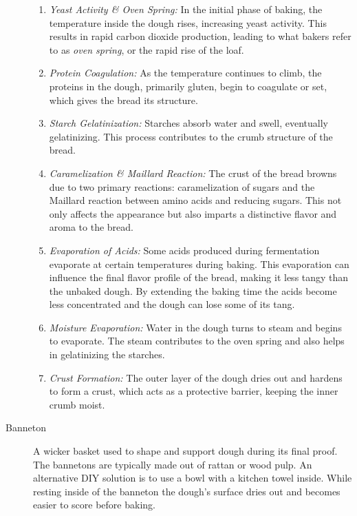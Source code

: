 \begin{description}
\begin{enumerate}
\item \emph{Yeast Activity \& Oven Spring:} In the initial phase of baking, the
temperature inside the dough rises, increasing yeast activity. This results in rapid
carbon dioxide production, leading to what bakers refer to as \emph{oven spring}, or the
rapid rise of the loaf.

\item \emph{Protein Coagulation:}  As the temperature continues to climb, the proteins
in the dough, primarily gluten, begin to coagulate or set, which gives the bread its
structure.

\item \emph{Starch Gelatinization:}  Starches absorb water and swell, eventually
gelatinizing. This process contributes to the crumb structure of the bread.

\item \emph{Caramelization \& Maillard Reaction:}  The crust of the bread browns due
to two primary reactions: caramelization of sugars and the Maillard reaction between
amino acids and reducing sugars. This not only affects the appearance but also imparts
a distinctive flavor and aroma to the bread.

\item \emph{Evaporation of Acids:} Some acids produced during fermentation evaporate at
certain temperatures during baking. This evaporation can influence the final flavor
profile of the bread, making it less tangy than the unbaked dough. By extending the
baking time the acids become less concentrated and the dough can lose some of its tang.

\item \emph{Moisture Evaporation:} Water in the dough turns to steam and begins to
evaporate. The steam contributes to the oven spring and also helps in gelatinizing
the starches.

\item \emph{Crust Formation:} The outer layer of the dough dries out and hardens to
form a crust, which acts as a protective barrier, keeping the inner crumb moist.
\end{enumerate}

\item[Banneton] A wicker basket used to shape and support dough during its final
proof. The bannetons are typically made out of rattan or wood pulp. An alternative
DIY solution is to use a bowl with a kitchen towel inside. While resting inside of
the banneton the dough’s surface dries out and becomes easier to score before baking.


\end{description}
